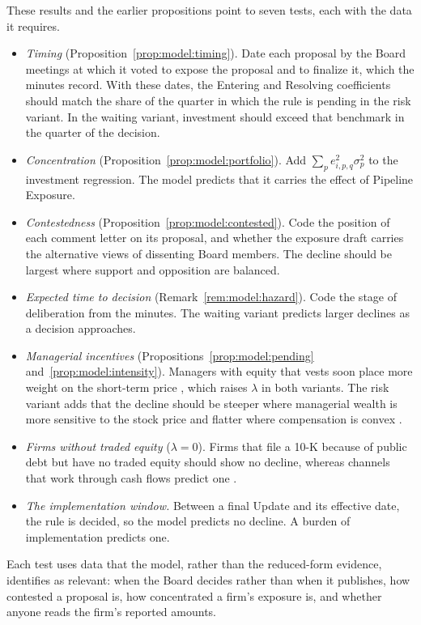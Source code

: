 These results and the earlier propositions point to seven tests, each with the data it requires.
\begin{itemize}
  \item \emph{Timing} (Proposition~\ref{prop:model:timing}). Date each proposal by the Board meetings at which it voted to expose the proposal and to finalize it, which the minutes record. With these dates, the Entering and Resolving coefficients should match the share of the quarter in which the rule is pending in the risk variant. In the waiting variant, investment should exceed that benchmark in the quarter of the decision.
  \item \emph{Concentration} (Proposition~\ref{prop:model:portfolio}). Add $\sum_p e_{i,p,q}^{2}\sigma_p^{2}$ to the investment regression. The model predicts that it carries the effect of Pipeline Exposure.
  \item \emph{Contestedness} (Proposition~\ref{prop:model:contested}). Code the position of each comment letter on its proposal, and whether the exposure draft carries the alternative views of dissenting Board members. The decline should be largest where support and opposition are balanced.
  \item \emph{Expected time to decision} (Remark~\ref{rem:model:hazard}). Code the stage of deliberation from the minutes. The waiting variant predicts larger declines as a decision approaches.
  \item \emph{Managerial incentives} (Propositions~\ref{prop:model:pending} and~\ref{prop:model:intensity}). Managers with equity that vests soon place more weight on the short-term price \citep{edmans2017equity}, which raises $\lambda$ in both variants. The risk variant adds that the decline should be steeper where managerial wealth is more sensitive to the stock price and flatter where compensation is convex \citep{core2002estimating}.
  \item \emph{Firms without traded equity} ($\lambda=0$). Firms that file a 10-K because of public debt but have no traded equity should show no decline, whereas channels that work through cash flows predict one \citep[compare][]{asker2015corporate}.
  \item \emph{The implementation window.} Between a final Update and its effective date, the rule is decided, so the model predicts no decline. A burden of implementation predicts one.
\end{itemize}

Each test uses data that the model, rather than the reduced-form evidence, identifies as relevant: when the Board decides rather than when it publishes, how contested a proposal is, how concentrated a firm's exposure is, and whether anyone reads the firm's reported amounts.
